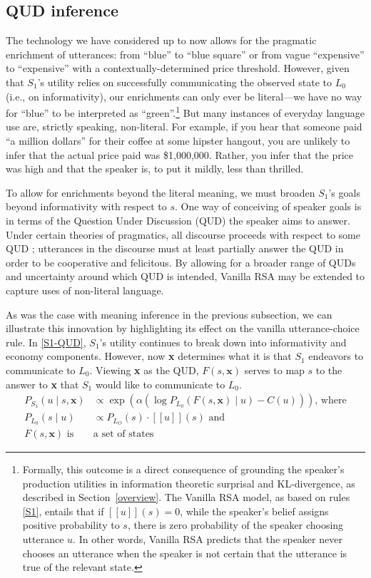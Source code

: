 \documentclass[10pt,letterpaper]{article}
\newcommand{\sem}[1]{\ensuremath{[\![#1]\!]}}
\begin{document}
\subsection*{QUD inference} \label{QUD-section}

The technology we have considered up to now allows for the pragmatic enrichment of utterances: from ``blue'' to ``blue square'' or from vague ``expensive'' to ``expensive'' with a contextually-determined price threshold. However, given that $S_1$'s utility relies on successfully communicating the observed state to $L_0$ (i.e., on informativity), our enrichments can only ever be literal---we have no way for ``blue'' to be interpreted as ``green''.\footnote{
  Formally, this outcome is a direct consequence of grounding the speaker's production utilities in information theoretic surprisal and KL-divergence, as described in Section~\ref{overview}. The Vanilla RSA model, as based on rules \eqref{S1}, entails that if $\sem{u}(s)=0$, while the speaker's belief assigns positive probability to $s$, there is zero probability of the speaker choosing utterance $u$. In other words, Vanilla RSA predicts that the speaker never chooses an utterance when the speaker is not certain that the utterance is true of the relevant state.
}
But many instances of everyday language use are, strictly speaking, non-literal. For example, if you hear that someone paid ``a million dollars'' for their coffee at some hipster hangout, you are unlikely to infer that the actual price paid was \$1,000,000. Rather, you infer that the price was high and that the speaker is, to put it mildly, less than thrilled.

To allow for enrichments beyond the literal meaning, we must broaden $S_1$'s goals beyond informativity with respect to $s$. One way of conceiving of speaker goals is in terms of the Question Under Discussion (QUD) the speaker aims to answer. Under certain theories of pragmatics, all discourse proceeds with respect to some QUD \cite{roberts2012}; utterances in the discourse must at least partially answer the QUD in order to be cooperative and felicitous. By allowing for a broader range of QUDs and uncertainty around which QUD is intended, Vanilla RSA may be extended to capture uses of non-literal language.

As was the case with meaning inference in the previous subsection, we can illustrate this innovation by highlighting its effect on the vanilla utterance-choice rule. In \eqref{S1-QUD}, $S_1$'s utility continues to break down into informativity and economy components. However, now \textbf{x} determines what it is that $S_1$ endeavors to communicate to $L_0$. Viewing \textbf{x} as the QUD, $F(s,\textbf{x})$ serves to map $s$ to the answer to \textbf{x} that $S_1$ would like to communicate to $L_0$.
\begin{align} \label{S1-QUD}
P_{S_1}(u\mid s, \textbf{x}) & \propto \exp (\alpha (\log P_{L_0}(F(s,\textbf{x})\mid u) - C(u)))\text{, where} \\
  P_{L_0}(s \mid u) & \propto P_{L_O}(s)  \cdot \sem{u}(s) \text{ and } \nonumber \\
  F(s,\textbf{x}) \text{ is } & \text{a set of states} \nonumber 
\end{align}
\end{document}
